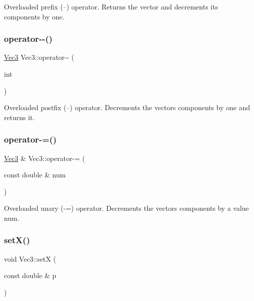 Overloaded prefix (--) operator. Returns the vector and decrements its components by one. 

\mbox{\label{classVec3_af7ab68e162bbec89988a914dbf14c371}} 
\subsubsection{\texorpdfstring{operator-\/-\/()}{operator--()}\hspace{0.1cm}{\footnotesize\ttfamily [2/2]}}
{\footnotesize\ttfamily \mbox{\hyperlink{classVec3}{Vec3}} Vec3\+::operator-\/-\/ (\begin{DoxyParamCaption}\item[{int}]{ }\end{DoxyParamCaption})}



Overloaded postfix (--) operator. Decrements the vectors components by one and returns it. 

\mbox{\label{classVec3_a36e57fe7792f322226047185219f8783}} 
\subsubsection{\texorpdfstring{operator-\/=()}{operator-=()}}
{\footnotesize\ttfamily \mbox{\hyperlink{classVec3}{Vec3}} \& Vec3\+::operator-\/= (\begin{DoxyParamCaption}\item[{const double \&}]{num }\end{DoxyParamCaption})}



Overloaded unary (-\/=) operator. Decrements the vector\textquotesingle{}s components by a value num. 

\mbox{\label{classVec3_a83a4fdb7ce021c5f28a677b05bf21d69}} 
\subsubsection{\texorpdfstring{set\+X()}{setX()}}
{\footnotesize\ttfamily void Vec3\+::setX (\begin{DoxyParamCaption}\item[{const double \&}]{p }\end{DoxyParamCaption})\hspace{0.3cm}{\ttfamily [inline]}}



